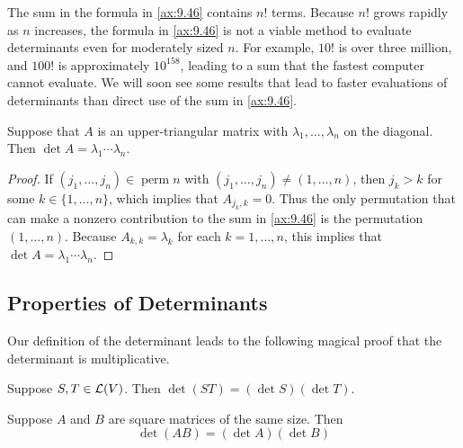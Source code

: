 The sum in the formula in \ref{ax:9.46} contains $n!$ terms. Because $n!$ grows
rapidly as $n$ increases, the formula in \ref{ax:9.46} is not a viable method
to evaluate determinants even for moderately sized $n$. For example, $10!$ is
over three million, and $100!$ is approximately $10^{158}$, leading to a sum
that the fastest computer cannot evaluate. We will soon see some results that
lead to faster evaluations of determinants than direct use of the sum in
\ref{ax:9.46}.

\begin{result}\label{ax:9.48}
Suppose that $A$ is an upper-triangular matrix with
$\lambda_1,\dots,\lambda_n$ on the diagonal. Then
$\det A=\lambda_1\cdots\lambda_n$.
\end{result}

\begin{proof}
If $(j_1,\dots,j_n)\in\operatorname{perm} n$ with
$(j_1,\dots,j_n)\ne(1,\dots,n)$, then $j_k>k$ for some $k\in\{1,\dots,n\}$,
which implies that $A_{j_k,k}=0$. Thus the only permutation that can make a
nonzero contribution to the sum in \ref{ax:9.46} is the permutation
$(1,\dots,n)$. Because $A_{k,k}=\lambda_k$ for each $k=1,\dots,n$, this implies
that $\det A=\lambda_1\cdots\lambda_n$.
\end{proof}

\subsection{Properties of Determinants}

Our definition of the determinant leads to the following magical proof that
the determinant is multiplicative.

\begin{result}\label{ax:9.49}\leavevmode
\begin{parts}
\item Suppose $S,T\in\mathcal{L}(V)$. Then $\det(ST)=(\det S)(\det T)$.
\item Suppose $A$ and $B$ are square matrices of the same size. Then
  \[ \det(AB) = (\det A)(\det B) \]
\end{parts}
\end{result}

